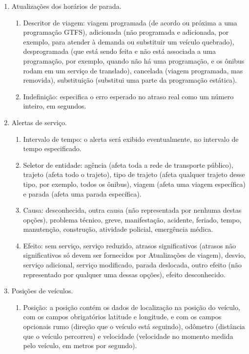 \documentclass[
	12pt,				%
	oneside,			%
	a4paper,			%
	english,			%
	brazil				%
	]{abntex2ppgsi}
\begin{document}
{{\begin{enumerate}
\item Atualizações dos horários de parada.
\begin{enumerate}
\item Descritor de viagem: viagem programada (de acordo ou próxima a uma programação GTFS), adicionada (não programada e adicionada, por exemplo, para atender à demanda ou substituir um veículo quebrado), desprogramada (que está sendo feita e não está associada a uma programação, por exemplo, quando não há uma programação, e os ônibus rodam em um serviço de translado), cancelada (viagem programada, mas removida), substituição (substitui uma parte da programação estática).
\item Indefinição: especifica o erro esperado no atraso real como um número inteiro, em segundos.
\end{enumerate}
\item Alertas de serviço.
\begin{enumerate}
\item Intervalo de tempo: o alerta será exibido eventualmente, no intervalo de tempo especificado.
\item Seletor de entidade: agência (afeta toda a rede de transporte público), trajeto (afeta todo o trajeto), tipo de trajeto (afeta qualquer trajeto desse tipo, por exemplo, todos os ônibus), viagem (afeta uma viagem específica) e  parada (afeta uma parada específica).
\item Causa: desconhecida, outra causa (não representada por nenhuma destas opções), problema técnico, greve, manifestação, acidente, feriado, tempo, manutenção, construção, atividade policial, emergência médica.
\item Efeito: sem serviço, serviço reduzido, atrasos significativos (atrasos não significativos só devem ser fornecidos por Atualizações de viagem), desvio, serviço adicional, serviço modificado, parada deslocada, outro efeito (não representado por qualquer uma dessas opções), efeito desconhecido.
\end{enumerate}
\item Posições de veículos.
\begin{enumerate}
\item Posição: a posição contém os dados de localização na posição do veículo, com os campos obrigatórios latitude e longitude, e com os campos opcionais rumo (direção que o veículo está seguindo), odômetro (distância que o veículo percorreu) e velocidade (velocidade no momento medida pelo veículo, em metros por segundo).

\end{enumerate}
\end{enumerate}}}
\end{document}
